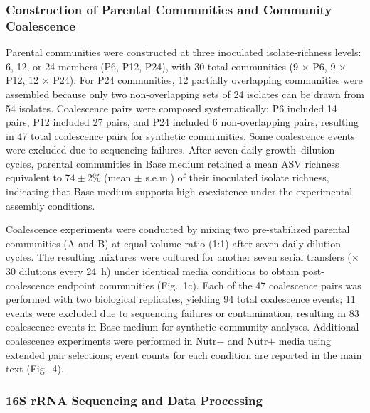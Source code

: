 \subsubsection*{Construction of Parental Communities and Community Coalescence}
\label{sec:suppl:coalescence}

Parental communities were constructed at three inoculated isolate-richness levels: 6, 12, or 24 members (P6, P12, P24), with 30 total communities (9 $\times$ P6, 9 $\times$ P12, 12 $\times$ P24). For P24 communities, 12 partially overlapping communities were assembled because only two non-overlapping sets of 24 isolates can be drawn from 54 isolates. Coalescence pairs were composed systematically: P6 included 14 pairs, P12 included 27 pairs, and P24 included 6 non-overlapping pairs, resulting in 47 total coalescence pairs for synthetic communities. Some coalescence events were excluded due to sequencing failures. After seven daily growth--dilution cycles, parental communities in Base medium retained a mean ASV richness equivalent to $74 \pm 2$\% (mean $\pm$ s.e.m.) of their inoculated isolate richness, indicating that Base medium supports high coexistence under the experimental assembly conditions.

Coalescence experiments were conducted by mixing two pre-stabilized parental communities (A and B) at equal volume ratio (1:1) after seven daily dilution cycles. The resulting mixtures were cultured for another seven serial transfers ($\times$30 dilutions every 24~h) under identical media conditions to obtain post-coalescence endpoint communities (Fig.~1c). Each of the 47 coalescence pairs was performed with two biological replicates, yielding 94 total coalescence events; 11 events were excluded due to sequencing failures or contamination, resulting in 83 coalescence events in Base medium for synthetic community analyses. Additional coalescence experiments were performed in Nutr$-$ and Nutr$+$ media using extended pair selections; event counts for each condition are reported in the main text (Fig.~4).


\subsubsection*{16S rRNA Sequencing and Data Processing}
\label{sec:suppl:methods:sequencing}


